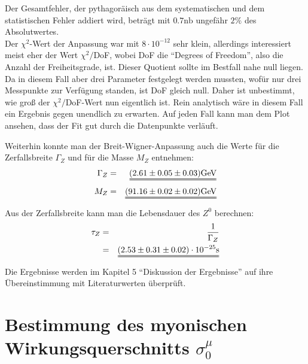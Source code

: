 Der Gesamtfehler, der pythagoräisch aus dem systematischen und dem statistischen Fehler addiert wird, beträgt mit $0.7\si{\nano\barn}$ ungefähr $2\%$ des Absolutwertes.\\
Der $\chi^2$-Wert der Anpassung war mit $8\cdot10^{-12}$ sehr klein, allerdings interessiert meist eher der Wert $\chi^2/$DoF, wobei DoF die ``Degrees of Freedom'', also die Anzahl der Freiheitsgrade, ist. Dieser Quotient sollte  im Bestfall nahe null liegen. Da in diesem Fall aber drei Parameter festgelegt werden mussten, wofür nur drei Messpunkte zur Verfügung standen, ist DoF gleich null. Daher ist unbestimmt, wie groß der $\chi^2/$DoF-Wert nun eigentlich ist.
Rein analytisch wäre in diesem Fall ein Ergebnis gegen unendlich zu erwarten.
Auf jeden Fall kann man dem Plot  ansehen, dass der Fit gut durch die Datenpunkte verläuft.

Weiterhin konnte man der Breit-Wigner-Anpassung auch die Werte für die Zerfallsbreite $\Gamma_Z$ und für die Masse $M_Z$ entnehmen:
\begin{eqnarray*}
\Gamma_Z &=& \uuline{(2.61 \pm 0.05 \pm 0.03)\si{\giga\electronvolt}}\\
M_Z &=& \uuline{(91.16 \pm 0.02 \pm 0.02)\si{\giga\electronvolt}}
\end{eqnarray*}
Aus der Zerfallsbreite kann man die Lebensdauer des $Z^0$ berechnen:
\begin{eqnarray}
\tau_Z &=& \frac{1}{\Gamma_Z}\\
\nonumber &=& \uuline{(2.53 \pm 0.31 \pm 0.02)\cdot 10^{-25}\si{\second}}
\end{eqnarray}
Die Ergebnisse werden im Kapitel 5 ``Diskussion der Ergebnisse'' auf ihre Übereinstimmung mit Literaturwerten überprüft.

\section{Bestimmung des myonischen Wirkungsquerschnitts $\sigma_0^{\mu}$}
